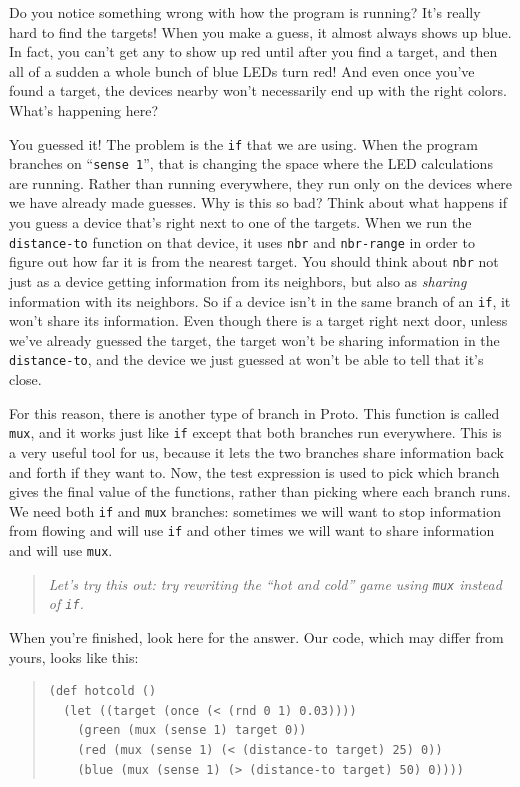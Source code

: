 \documentclass{article}
\newcommand\problem[1]{\begin{quote}{\em #1}\end{quote}}
\newcommand\var[1]{{\tt #1}}
\newcommand\qvar[1]{``{\tt #1}''}
\begin{document}
Do you notice something wrong with how the program is running?  It's
really hard to find the targets!  When you make a guess, it almost
always shows up blue.  In fact, you can't get any to show up red until
after you find a target, and then all of a sudden a whole bunch of
blue LEDs turn red!  And even once you've found a target, the devices
nearby won't necessarily end up with the right colors.  What's
happening here?

You guessed it!  The problem is the \var{if} that we are using.  When
the program branches on \qvar{sense 1}, that is changing the space
where the LED calculations are running.  Rather than running
everywhere, they run only on the devices where we have already made
guesses.  Why is this so bad?  Think about what happens if you guess a
device that's right next to one of the targets.  When we run the
\var{distance-to} function on that device, it uses \var{nbr} and
\var{nbr-range} in order to figure out how far it is from the nearest
target.  You should think about \var{nbr} not just as a device getting
information from its neighbors, but also as {\em sharing} information
with its neighbors.  So if a device isn't in the same branch of an
\var{if}, it won't share its information.  Even though there is a
target right next door, unless we've already guessed the target, the
target won't be sharing information in the \var{distance-to}, and the
device we just guessed at won't be able to tell that it's close.

For this reason, there is another type of branch in Proto.  This
function is called \var{mux}, and it works just like \var{if} except
that both branches run everywhere.  This is a very useful tool for us,
because it lets the two branches share information back and forth if
they want to.  Now, the test expression is used to pick which branch
gives the final value of the functions, rather than picking where each
branch runs.  We need both \var{if} and \var{mux} branches: sometimes
we will want to stop information from flowing and will use \var{if}
and other times we will want to share information and will use
\var{mux}.

\problem{Let's try this out: try rewriting the ``hot and cold'' game
  using \var{mux} instead of \var{if}.}

When you're finished, look here for the answer.  Our code, which may differ
from yours, looks like this:

\begin{quote}
\begin{verbatim}
(def hotcold ()
  (let ((target (once (< (rnd 0 1) 0.03))))
    (green (mux (sense 1) target 0))
    (red (mux (sense 1) (< (distance-to target) 25) 0))
    (blue (mux (sense 1) (> (distance-to target) 50) 0))))
\end{verbatim}
\end{quote}
\end{document}
